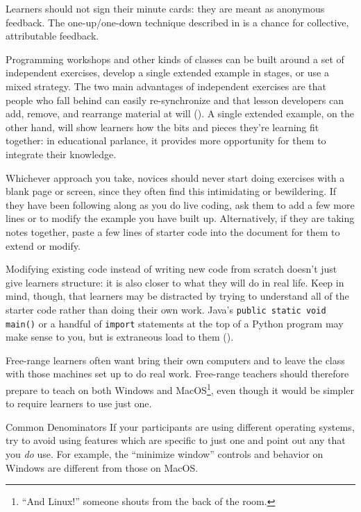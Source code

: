 Learners should not sign their minute cards:
they are meant as anonymous feedback.
The one-up/one-down technique described in 
is a chance for collective, attributable feedback.


Programming workshops and other kinds of classes
can be built around a set of independent exercises,
develop a single extended example in stages,
or use a mixed strategy.
The two main advantages of independent exercises are that
people who fall behind can easily re-synchronize
and that lesson developers can add, remove, and rearrange material at will
().
A single extended example,
on the other hand,
will show learners how the bits and pieces they're learning fit together:
in educational parlance,
it provides more opportunity for them to integrate their knowledge.

Whichever approach you take,
novices should never start doing exercises with a blank page or screen,
since they often find this intimidating or bewildering.
If they have been following along as you do live coding,
ask them to add a few more lines
or to modify the example you have built up.
Alternatively, if they are taking notes together,
paste a few lines of starter code into the document
for them to extend or modify.

Modifying existing code instead of writing new code from scratch
doesn't just give learners structure:
it is also closer to what they will do in real life.
Keep in mind,
though,
that learners may be distracted by trying to understand all of the starter code
rather than doing their own work.
Java's \texttt{public static void main()}
or a handful of \texttt{import} statements at the top of a Python program
may make sense to you,
but is extraneous load to them ().


Free-range learners often want bring their own computers
and to leave the class with those machines set up to do real work.
Free-range teachers should therefore prepare to teach on both Windows and MacOS\footnote{``And Linux!''
someone shouts from the back of the room.},
even though it would be simpler to require learners to use just one.

\begin{aside}{Common Denominators}
  If your participants are using different operating systems,
  try to avoid using features which are specific to just one
  and point out any that you \emph{do} use.
  For example,
  the ``minimize window'' controls and behavior on Windows are different
  from those on MacOS.
\end{aside}

